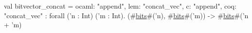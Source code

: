 val bitvector_concat = {ocaml: "append", lem: "concat_vec", c: "append", coq: "concat_vec"} : forall ('n : Int) ('m : Int).
  (#\hyperref[zbits]{bits}#('n), #\hyperref[zbits]{bits}#('m)) -> #\hyperref[zbits]{bits}#('n + 'm)
